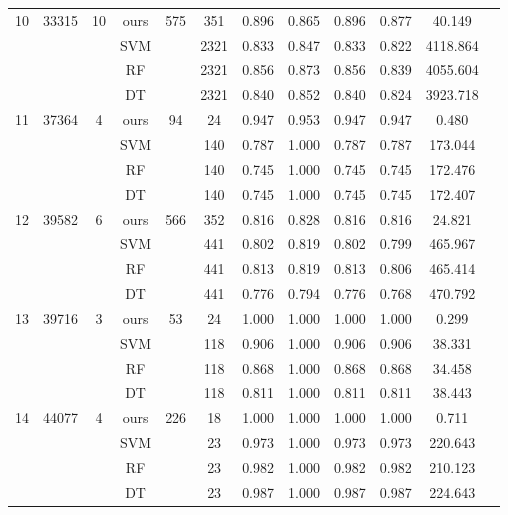 \begin{table}[htbp]
\begin{tabular}{cccccccccccc}
        \midrule
        10 & 33315 & 10 & ours & 575 & 351 & 0.896 & 0.865 & 0.896 & 0.877 & 40.149 \\
           &       &    & SVM  &     & 2321 & 0.833 & 0.847 & 0.833 & 0.822 & 4118.864 \\
           &       &    & RF   &     & 2321 & 0.856 & 0.873 & 0.856 & 0.839 & 4055.604 \\
           &       &    & DT   &     & 2321 & 0.840 & 0.852 & 0.840 & 0.824 & 3923.718 \\
        \midrule
        11 & 37364 & 4 & ours & 94  & 24  & 0.947 & 0.953 & 0.947 & 0.947 & 0.480 \\
           &       &   & SVM  &     & 140 & 0.787 & 1.000 & 0.787 & 0.787 & 173.044 \\
           &       &   & RF   &     & 140 & 0.745 & 1.000 & 0.745 & 0.745 & 172.476 \\
           &       &   & DT   &     & 140 & 0.745 & 1.000 & 0.745 & 0.745 & 172.407 \\
        \midrule
        12 & 39582 & 6 & ours & 566 & 352 & 0.816 & 0.828 & 0.816 & 0.816 & 24.821 \\
           &       &   & SVM  &     & 441 & 0.802 & 0.819 & 0.802 & 0.799 & 465.967 \\
           &       &   & RF   &     & 441 & 0.813 & 0.819 & 0.813 & 0.806 & 465.414 \\
           &       &   & DT   &     & 441 & 0.776 & 0.794 & 0.776 & 0.768 & 470.792 \\
        \midrule
        13 & 39716 & 3 & ours & 53  & 24  & 1.000 & 1.000 & 1.000 & 1.000 & 0.299 \\
           &       &   & SVM  &     & 118 & 0.906 & 1.000 & 0.906 & 0.906 & 38.331 \\
           &       &   & RF   &     & 118 & 0.868 & 1.000 & 0.868 & 0.868 & 34.458 \\
           &       &   & DT   &     & 118 & 0.811 & 1.000 & 0.811 & 0.811 & 38.443 \\
        \midrule
        14 & 44077 & 4 & ours & 226 & 18  & 1.000 & 1.000 & 1.000 & 1.000 & 0.711 \\
           &       &   & SVM  &     & 23  & 0.973 & 1.000 & 0.973 & 0.973 & 220.643 \\
           &       &   & RF   &     & 23  & 0.982 & 1.000 & 0.982 & 0.982 & 210.123 \\
           &       &   & DT   &     & 23  & 0.987 & 1.000 & 0.987 & 0.987 & 224.643 \\
     \bottomrule
  \end{tabular}
\end{table}



